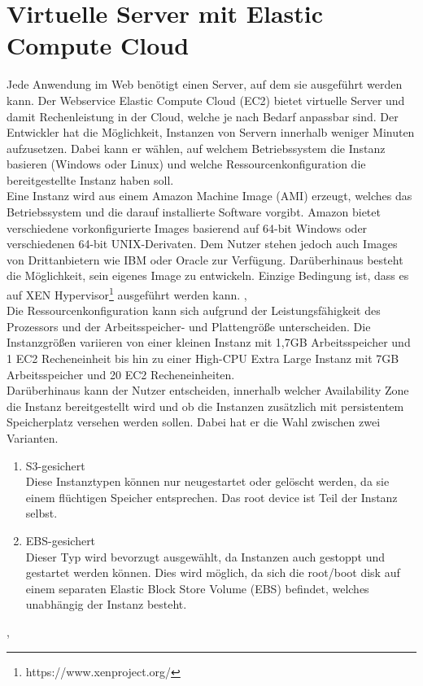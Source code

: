 \section{Virtuelle Server mit Elastic Compute Cloud}
\label{sec:ec2}
Jede Anwendung im Web benötigt einen Server, auf dem sie ausgeführt werden kann. Der Webservice Elastic Compute Cloud (EC2) bietet virtuelle Server und damit Rechenleistung in der Cloud, welche je nach Bedarf anpassbar sind. \cite{aws:ec2}
Der Entwickler hat die Möglichkeit, Instanzen von Servern innerhalb weniger Minuten aufzusetzen. Dabei kann er wählen, auf welchem Betriebssystem die Instanz basieren (Windows oder Linux) und welche Ressourcenkonfiguration die bereitgestellte Instanz haben soll. \cite{aws:ec2} \\

Eine Instanz wird aus einem Amazon Machine Image (AMI) erzeugt, welches das Betriebssystem und die darauf installierte Software vorgibt. Amazon bietet verschiedene vorkonfigurierte Images basierend auf 64-bit Windows oder verschiedenen 64-bit UNIX-Derivaten. Dem Nutzer stehen jedoch auch Images von Drittanbietern wie IBM oder Oracle zur Verfügung. Darüberhinaus besteht die Möglichkeit, sein eigenes Image zu entwickeln. Einzige Bedingung ist, dass es auf XEN Hypervisor\footnote{https://www.xenproject.org/} ausgeführt werden kann. \cite{baun:cloudcomp}, \cite{vliet:resilience} \\

Die Ressourcenkonfiguration kann sich aufgrund der Leistungsfähigkeit des Prozessors und der Arbeitsspeicher- und Plattengröße unterscheiden. Die Instanzgrößen variieren von einer kleinen Instanz mit 1,7GB Arbeitsspeicher und 1 EC2 Recheneinheit bis hin zu einer High-CPU Extra Large Instanz mit 7GB Arbeitsspeicher und 20 EC2 Recheneinheiten. \cite{vliet:resilience} \\

Darüberhinaus kann der Nutzer entscheiden, innerhalb welcher Availability Zone die Instanz bereitgestellt wird und ob die Instanzen zusätzlich mit persistentem Speicherplatz versehen werden sollen. Dabei hat er die Wahl zwischen zwei Varianten.
\begin{enumerate}
  \item S3-gesichert \\
  Diese Instanztypen können nur neugestartet oder gelöscht werden, da sie einem flüchtigen Speicher entsprechen. Das root device ist Teil der Instanz selbst.
  \item EBS-gesichert \\
  Dieser Typ wird bevorzugt ausgewählt, da Instanzen auch gestoppt und gestartet werden können. Dies wird möglich, da sich die root/boot disk auf einem separaten Elastic Block Store Volume (EBS) befindet, welches unabhängig der Instanz besteht.
\end{enumerate}
\cite{vliet:resilience}, \cite{aws:ec2} \\

